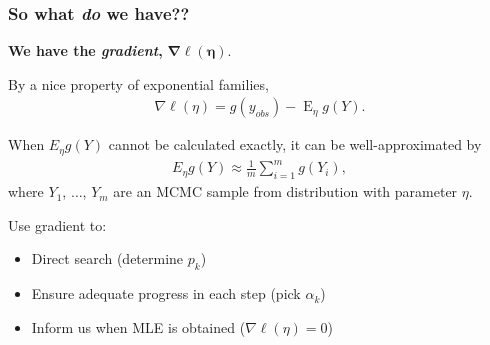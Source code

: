 \documentclass[ 10pt]{beamer}
\DeclareMathOperator{\E}{E}
\begin{document}
\frame
{
\frametitle{So what \emph{do} we have??}

{\textbf{We have the \emph{gradient},} $\boldsymbol{\nabla \ell(\eta)}$.}
\vspace*{2mm}

By a nice property of exponential families,
\begin{align*}
	\nabla \ell( \eta ) = g(y_{obs}) - \E_{\eta} g(Y).
\end{align*}

\pause
When $E_\eta g(Y)$ cannot be calculated exactly, it can be well-approximated by
\begin{align*}
E_\eta g(Y) \approx \frac{1}{m}\sum_{i = 1}^m g(Y_i),
\end{align*}
where $Y_1$, $\ldots$, $Y_m$ are an MCMC sample from distribution with parameter $\eta$.
\vspace*{4mm}

\pause
Use gradient to: 
\vspace*{2mm}
\begin{itemize}
\item Direct search  (determine $p_k$)
\vspace*{2mm}

\item Ensure adequate progress  in each step  (pick $\alpha_k$)
\vspace*{2mm}

\item Inform us when MLE is obtained  ($\nabla \ell(\eta) = 0$)
\end{itemize}

}
\end{document}
